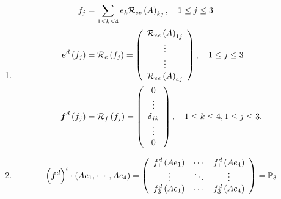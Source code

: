 \documentclass[aps,preprint]{revtex4}%
\begin{document}
\begin{enumerate}
\begin{enumerate}
\begin{gather}
\begin{array}
[c]{c}%
\mathcal{R}_{g}\left(  h_{1}\right)  _{1}\\
\vdots\\
\vdots\\
\mathcal{R}_{g}\left(  h_{1}\right)  _{4}%
\end{array}
\right)  \cdots\left(
\begin{array}
[c]{c}%
\mathcal{R}_{g}\left(  h_{3}\right)  _{1}\\
\vdots\\
\vdots\\
\mathcal{R}_{g}\left(  h_{3}\right)  _{4}%
\end{array}
\right)  \left(
\begin{array}
[c]{c}%
0\\
0\\
0\\
0
\end{array}
\right)  \right) \\
\parallel\\
\left(  h_{1},\cdots,h_{3},0\right)  \leftrightarrow\left(  h_{1},\cdots
,h_{3}\right)  ,
\end{gather}


\item
\begin{align}
f_{j}  &  =\sum_{1\leq k\leq4}e_{k}\mathcal{R}_{ee}\left(  A\right)
_{kj},\quad1\leq j\leq3\\
\boldsymbol{e}^{d}\left(  f_{j}\right)   &  =\mathcal{R}_{e}\left(
f_{j}\right)  =\left(
\begin{array}
[c]{c}%
\mathcal{R}_{ee}\left(  A\right)  _{1j}\\
\vdots\\
\vdots\\
\mathcal{R}_{ee}\left(  A\right)  _{4j}%
\end{array}
\right)  ,\quad1\leq j\leq3\\
\boldsymbol{f}^{d}\left(  f_{j}\right)   &  =\mathcal{R}_{f}\left(
f_{j}\right)  =\left(
\begin{array}
[c]{c}%
0\\
\vdots\\
\delta_{jk}\\
\vdots\\
0
\end{array}
\right)  ,\quad1\leq k\leq4,1\leq j\leq3.
\end{align}


\item
\begin{equation}
\left(  \boldsymbol{f}^{d}\right)  ^{t}\cdot\left(  Ae_{1},\cdots
,Ae_{4}\right)  =\left(
\begin{array}
[c]{ccc}%
f_{1}^{d}\left(  Ae_{1}\right)  & \cdots & f_{1}^{d}\left(  Ae_{4}\right) \\
\vdots & \ddots & \vdots\\
f_{3}^{d}\left(  Ae_{1}\right)  & \cdots & f_{3}^{d}\left(  Ae_{4}\right)
\end{array}
\right)  =\mathbb{P}_{3}%
\end{equation}



\end{enumerate}
\end{enumerate}
\end{document}
